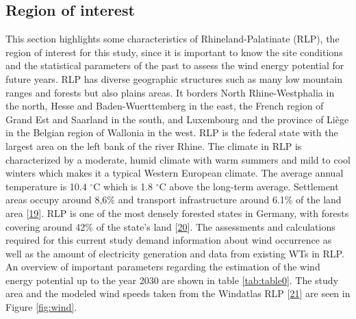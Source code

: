 \documentclass[a4paper,11pt]{article}
\begin{document}
\hypertarget{region-of-interest}{%
\subsection{Region of interest}\label{region-of-interest}}

This section highlights some characteristics of Rhineland-Palatinate (RLP), the region of interest for this study, since it is important to know the site conditions and the statistical parameters of the past to assess the wind energy potential for future years. RLP has diverse geographic structures such as many low mountain ranges and forests but also plains areas. It borders North Rhine-Westphalia in the north, Hesse and Baden-Wuerttemberg in the east, the French region of Grand Est and Saarland in the south, and Luxembourg and the province of Liège in the Belgian region of Wallonia in the west. RLP is the federal state with the largest area on the left bank of the river Rhine. The climate in RLP is characterized by a moderate, humid climate with warm summers and mild to cool winters which makes it a typical Western European climate. The average annual temperature is 10.4 \(^\circ\)C which is 1.8 \(^\circ\)C above the long-term average. Settlement areas occupy around 8,6\% and transport infrastructure around 6.1\% of the land area {[}\protect\hyperlink{ref-StateStatisticalOfficeofRhinelandPalatinate.2020}{19}{]}. RLP is one of the most densely forested states in Germany, with forests covering around 42\% of the state's land {[}\protect\hyperlink{ref-HansenandLamour.2021}{20}{]}. The assessments and calculations required for this current study demand information about wind occurrence as well as the amount of electricity generation and data from existing WTs in RLP. An overview of important parameters regarding the estimation of the wind energy potential up to the year 2030 are shown in table \ref{tab:table0}. The study area and the modeled wind speeds taken from the Windatlas RLP {[}\protect\hyperlink{ref-MinisteriumfurWirtschaftKlimaschutzEnergieundLandesplanung.2013}{21}{]} are seen in Figure \ref{fig:wind}.
\end{document}

